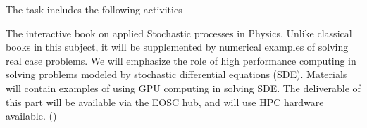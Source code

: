 \begin{task}[
  title=Online resources for open science,
  id=online-resources,
  lead=INSERM,
  PM=14,
  wphases={0-48},
  partners={SRL,XFEL,QS,CDS,WTT,SIL,UPSUD,EP}
]
  The task includes the following activities
  \begin{compactitem}
  \item The interactive book on applied Stochastic processes in Physics. Unlike classical books in this subject, it will be supplemented by numerical examples of solving real case problems. We will emphasize the
role of high performance computing in solving problems modeled by stochastic differential equations (SDE). Materials will contain examples of using GPU computing in solving SDE. The deliverable of this part will be available via the EOSC hub, and will use HPC hardware available. ()
  \end{compactitem}
\end{task}
